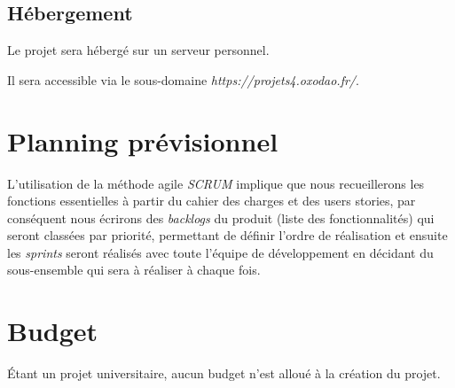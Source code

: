 \documentclass[oneside]{report}
\begin{document}
	\section{Hébergement}
	{
		\par Le projet sera hébergé sur un serveur personnel.
		\par Il sera accessible via le sous-domaine \textit{https://projets4.oxodao.fr/}.
	}

	\chapter{Planning prévisionnel}
	\par L'utilisation de la méthode agile \textit{SCRUM} implique que nous recueillerons les fonctions essentielles à partir du cahier des charges et des users stories, par conséquent nous écrirons des \textit{backlogs} du produit (liste des fonctionnalités) qui seront classées par priorité, permettant de définir l'ordre de réalisation et ensuite les \textit{sprints} seront réalisés avec toute l'équipe de développement en décidant du sous-ensemble qui sera à réaliser à chaque fois.

	\chapter{Budget}
	\par Étant un projet universitaire, aucun budget n'est alloué à la création du projet.
\end{document}
